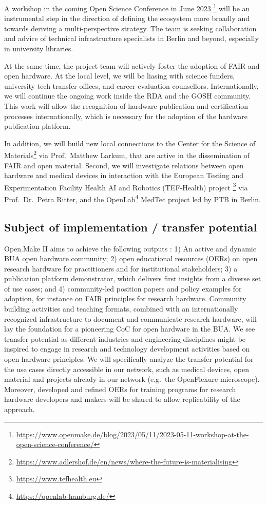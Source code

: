 \documentclass[
  12pt,
  a4paper,
]{article}
\begin{document}
A workshop in the coming Open Science Conference in June 2023
\footnote{\url{https://www.openmake.de/blog/2023/05/11/2023-05-11-workshop-at-the-open-science-conference/}}
will be an instrumental step in the direction of defining the ecosystem
more broadly and towards deriving a multi-perspective strategy. The team
is seeking collaboration and advice of technical infrastructure
specialists in Berlin and beyond, especially in university libraries.

At the same time, the project team will actively foster the adoption of
FAIR and open hardware. At the local level, we will be liasing with
science funders, university tech transfer offices, and career evaluation
counsellors. Internationally, we will continue the ongoing work inside
the RDA and the GOSH community. This work will allow the recognition of
hardware publication and certification processes internationally, which
is necessary for the adoption of the hardware publication platform.

In addition, we will build new local connections to the Center for the
Science of Materials\footnote{\url{https://www.adlershof.de/en/news/where-the-future-is-materialising}}
via Prof.~Matthew Larkum, that are active in the dissemination of FAIR
and open material. Second, we will investigate relations between open
hardware and medical devices in interaction with the European Testing
and Experimentation Facility Health AI and Robotics (TEF-Health) project
\footnote{\url{https://www.tefhealth.eu}} via Prof.~Dr.~Petra Ritter,
and the OpenLab\footnote{\url{https://openlab-hamburg.de/}} MedTec
project led by PTB in Berlin.

\hypertarget{subject-of-implementation-transfer-potential}{%
\subsection{Subject of implementation / transfer
potential}\label{subject-of-implementation-transfer-potential}}

Open.Make II aims to achieve the following outputs : 1) An active and
dynamic BUA open hardware community; 2) open educational resources
(OERs) on open research hardware for practitioners and for institutional
stakeholders; 3) a publication platform demonstrator, which delivers
first insights from a diverse set of use cases; and 4) community-led
position papers and policy examples for adoption, for instance on FAIR
principles for research hardware. Community building activities and
teaching formats, combined with an internationally recognized
infrastructure to document and communicate research hardware, will lay
the foundation for a pioneering CoC for open hardware in the BUA. We see
transfer potential as different industries and engineering disciplines
might be inspired to engage in research and technology development
activities based on open hardware principles. We will specifically
analyze the transfer potential for the use cases directly accessible in
our network, such as medical devices, open material and projects already
in our network (e.g.~the OpenFlexure microscope). Moreover, developed
and refined OERs for training programs for research hardware developers
and makers will be shared to allow replicability of the approach.
\end{document}
